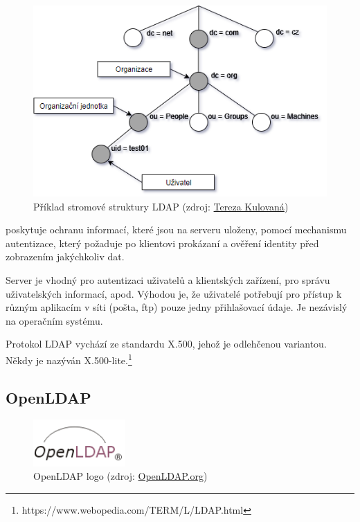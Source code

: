\begin{figure}[H] \centering
      \includegraphics[width=380pt]{./pictures/ldap_dit.png}
      \caption[Příklad stromové struktury LDAP]{Příklad stromové struktury LDAP (zdroj:
	  \href{}{Tereza Kulovaná})}
      \label{fig:ldap-dit}
\end{figure}

 poskytuje ochranu informací, které jsou na serveru uloženy,
pomocí mechanismu autentizace, který požaduje po klientovi prokázaní a
ověření identity před zobrazením jakýchkoliv dat.

Server  je vhodný pro autentizaci uživatelů a klientských
zařízení, pro správu uživatelských informací, apod. Výhodou je, že
uživatelé potřebují pro přístup k různým aplikacím v síti (pošta, ftp)
pouze jedny přihlašovací údaje. Je nezávislý na operačním systému.

Protokol LDAP vychází ze standardu X.500, jehož je odlehčenou
variantou. Někdy je nazýván
X.500-lite.\footnote{https://www.webopedia.com/TERM/L/LDAP.html}

\newpage
\subsection{OpenLDAP}
\label{openldap}

\begin{figure}[H] \centering
      \includegraphics[width=100pt]{./pictures/LDAPlogo.png}
      \caption[OpenLDAP logo]{OpenLDAP logo (zdroj:
	  \href{http://www.openldap.org/images/headers/LDAPlogo.gif}{OpenLDAP.org})}
      \label{fig:ldap}
\end{figure}

